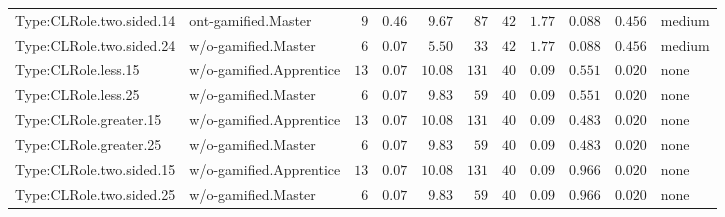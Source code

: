 \documentclass[6pt,a4paper]{article}
\begin{document}
{\begin{longtable}{llrrrrrrrrl}
Type:CLRole.two.sided.14&ont-gamified.Master&$ 9$&$0.46$&$ 9.67$&$ 87$&$ 42$&$ 1.77$&$0.088$&$0.456$&medium\tabularnewline
Type:CLRole.two.sided.24&w/o-gamified.Master&$ 6$&$0.07$&$ 5.50$&$ 33$&$ 42$&$ 1.77$&$0.088$&$0.456$&medium\tabularnewline
Type:CLRole.less.15&w/o-gamified.Apprentice&$13$&$0.07$&$10.08$&$131$&$ 40$&$ 0.09$&$0.551$&$0.020$&none\tabularnewline
Type:CLRole.less.25&w/o-gamified.Master&$ 6$&$0.07$&$ 9.83$&$ 59$&$ 40$&$ 0.09$&$0.551$&$0.020$&none\tabularnewline
Type:CLRole.greater.15&w/o-gamified.Apprentice&$13$&$0.07$&$10.08$&$131$&$ 40$&$ 0.09$&$0.483$&$0.020$&none\tabularnewline
Type:CLRole.greater.25&w/o-gamified.Master&$ 6$&$0.07$&$ 9.83$&$ 59$&$ 40$&$ 0.09$&$0.483$&$0.020$&none\tabularnewline
\newpage
Type:CLRole.two.sided.15&w/o-gamified.Apprentice&$13$&$0.07$&$10.08$&$131$&$ 40$&$ 0.09$&$0.966$&$0.020$&none\tabularnewline
Type:CLRole.two.sided.25&w/o-gamified.Master&$ 6$&$0.07$&$ 9.83$&$ 59$&$ 40$&$ 0.09$&$0.966$&$0.020$&none\tabularnewline
\hline
\end{longtable}}
\end{document}
